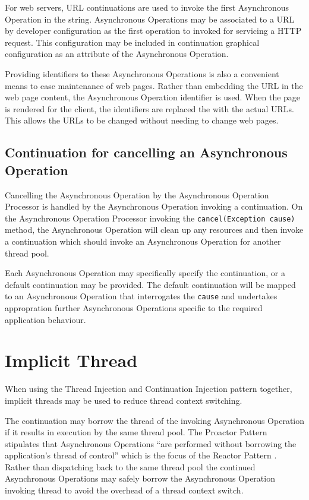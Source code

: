 \documentclass{article}
\begin{document}
For web servers, URL continuations \cite{url-continuation} are used to invoke
the first Asynchronous Operation in the string.  Asynchronous Operations may be
associated to a URL by developer configuration as the first operation to invoked
for servicing a HTTP request.  This configuration may be included in
continuation graphical configuration as an attribute of the Asynchronous
Operation.  

Providing identifiers to these Asynchronous Operations is also a convenient
means to ease maintenance of web pages.  Rather than embedding the URL in the
web page content, the Asynchronous Operation identifier is used.  When the page
is rendered for the client, the identifiers are replaced the with the actual
URLs.  This allows the URLs to be changed without needing to change web pages.


\subsection{Continuation for cancelling an Asynchronous Operation}

Cancelling the Asynchronous Operation by the Asynchronous Operation Processor is
handled by the Asynchronous Operation invoking a continuation.  On the
Asynchronous Operation Processor invoking the \texttt{cancel(Exception cause)}
method, the Asynchronous Operation will clean up any resources and then invoke a
continuation which should invoke an Asynchronous Operation for another thread
pool.

Each Asynchronous Operation may specifically specify the continuation, or a
default continuation may be provided.  The default continuation will be mapped
to an Asynchronous Operation that interrogates the \texttt{cause} and undertakes
appropration further Asynchronous Operations specific to the required
application behaviour.


\section{Implicit Thread}

When using the Thread Injection and Continuation Injection pattern together,
implicit threads may be used to reduce thread context switching.

The continuation may borrow the thread of the invoking Asynchronous Operation if
it results in execution by the same thread pool.  The Proactor Pattern
stipulates that Asynchronous Operations ``are performed without borrowing the
application's thread of control'' which is the focus of the Reactor Pattern
\cite{reactor}.  Rather than dispatching back to the same thread pool the
continued Asynchronous Operations may safely borrow the Asynchronous Operation
invoking thread to avoid the overhead of a thread context switch.
\end{document}
